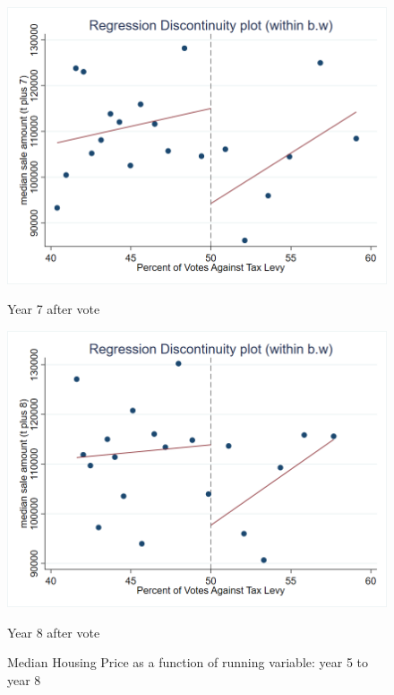 \begin{figure}[ht]
    \vspace{1em}
    
    \begin{minipage}[b]{0.48\textwidth}
        \centering
        \includegraphics[width=\textwidth,keepaspectratio]{images/rd_plot_median_sale_amount_t_plus_7_tri_mserd_1_2_within.png}
        \caption*{Year 7 after vote}
        \label{fig:hp_year7_after}
    \end{minipage}
    \hfill
    \begin{minipage}[b]{0.48\textwidth}
        \centering
        \includegraphics[width=\textwidth,keepaspectratio]{images/rd_plot_median_sale_amount_t_plus_8_tri_mserd_1_2_within.png}
        \caption*{Year 8 after vote}
        \label{fig:hp_year8_after}
    \end{minipage}
    
    \caption{Median Housing Price as a function of running variable: year 5 to year 8}
    \label{fig:rd_hp_2}
\end{figure}

